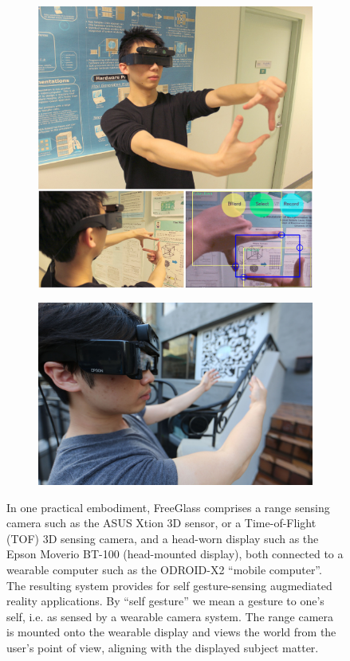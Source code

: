 \begin{figure}
\begin{subfigure}[b]{\columnwidth}
\centering
\includegraphics[width=0.6\columnwidth]{ch5/figs/crop_sample.jpg}
\end{subfigure}
\begin{subfigure}[b]{\columnwidth}
\centering
\vspace{.032in}
\includegraphics[width=0.6\columnwidth]{ch5/figs/wearable/low_res/qr_eyeglass_IMG_2092.jpg}
\end{subfigure}
\caption{In one practical embodiment, FreeGlass comprises a range sensing camera such
as the ASUS Xtion 3D sensor, or a Time-of-Flight (TOF) 3D sensing camera,
and a head-worn display such as the Epson Moverio BT-100 (head-mounted display),
both connected to a wearable computer such as the
ODROID-X2 ``mobile computer''.
The resulting system provides for self gesture-sensing
augmediated reality applications.
By ``self gesture'' we mean a gesture to one's self, i.e. as sensed by
a wearable camera system.
The range camera is mounted onto the wearable display and views the world from
the user's point of view, aligning with the displayed subject matter.}
\end{figure}

